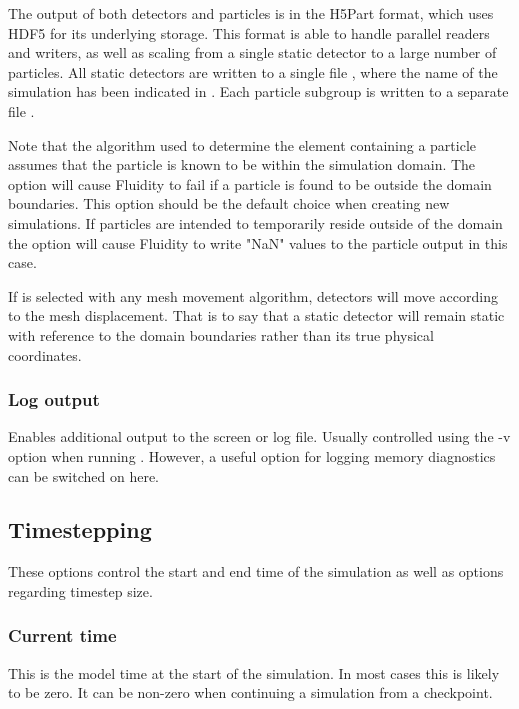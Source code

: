 The output of both detectors and particles is in the H5Part format,
which uses HDF5 for its underlying storage. This format is able to
handle parallel readers and writers, as well as scaling from a single
static detector to a large number of particles. All static detectors
are written to a single file
, where the name of the
simulation has been indicated in . Each
particle subgroup is written to a separate file
.

Note that the algorithm used to determine the element containing a particle assumes that the particle is known to be within the simulation domain.
The option  will cause Fluidity to fail if a particle is found to be outside the domain boundaries. 
This option should be the default choice when creating new simulations. If particles are intended to temporarily reside outside of the domain the option
 will cause Fluidity to write "NaN" values 
to the particle output in this case.

If  is selected with any mesh movement algorithm, detectors will move according to the mesh displacement. That is to say that a static detector will remain static with reference to the domain boundaries rather than its true physical coordinates.

\subsubsection{Log output}

Enables additional output to the screen or log file. Usually controlled
using the -v option when running \fluidity. However, a useful option for
logging memory diagnostics can be switched on here.

\subsection{Timestepping}
These options control the start and end time of the simulation as well as options regarding timestep size.

\subsubsection{Current time}
This is the model time at the start of the simulation. In most cases this is likely to be zero. It can be non-zero when continuing a simulation from a checkpoint.

